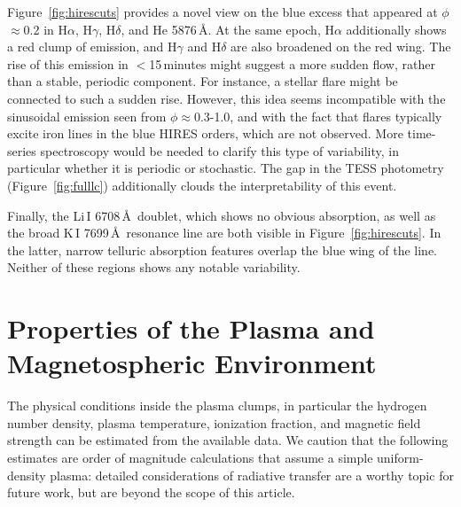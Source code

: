 \documentclass[11pt,twocolumn,tighten,linenumbers]{aastex7}
\begin{document}
Figure~\ref{fig:hirescuts} provides a novel view on the
blue excess that appeared at $\phi$$\approx$0.2 in H$\alpha$,
H$\gamma$, H$\delta$, and He 5876\,\AA.  At the same epoch, H$\alpha$
additionally shows a red clump of emission, and H$\gamma$ and
H$\delta$ are also broadened on the red wing.  The rise of this
emission in $<$15\,minutes might suggest a more sudden flow, rather
than a stable, periodic component.  For instance, a stellar flare
might be connected to such a sudden rise.  However, this idea seems
incompatible with the sinusoidal emission seen from
$\phi$$\approx$0.3-1.0, and with the fact that flares typically excite
iron lines in the blue HIRES orders, which are not observed.  More
time-series spectroscopy would be needed to clarify this type of
variability, in particular whether it is periodic or stochastic.
The gap in the TESS photometry (Figure~\ref{fig:fulllc}) additionally
clouds the interpretability of this event.


Finally, the Li\,\textsc{I} 6708\,\AA\ doublet, which shows no obvious
absorption, as well as the broad K\,\textsc{I} 7699\,\AA\ resonance
line are both visible in Figure~\ref{fig:hirescuts}.  In
the latter, narrow telluric absorption features overlap the blue wing
of the line.  Neither of these regions shows any notable variability.






\section{Properties of the Plasma and Magnetospheric Environment}
\label{subsec:gas}

The physical conditions inside the plasma clumps, in particular the
hydrogen number density, plasma temperature, ionization fraction, and
magnetic field strength can be estimated from the available data.  We
caution that the following estimates are order of magnitude
calculations that assume a simple uniform-density plasma: detailed
considerations of radiative transfer are a worthy topic for future
work, but are beyond the scope of this article.
\end{document}
